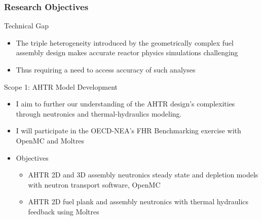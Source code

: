 \begin{frame}
  \frametitle{Research Objectives}
  \begin{block}{Technical Gap}
    \begin{itemize}
      \item The triple heterogeneity introduced by the geometrically complex 
      fuel assembly design makes accurate reactor physics simulations challenging
      \item Thus requiring a need to access accuracy of such analyses 
    \end{itemize}
  \end{block}
  \begin{block}{Scope 1: AHTR Model Development}
    \begin{itemize}
      \item I aim to further our understanding of the AHTR design's complexities 
      through neutronics and thermal-hydraulics modeling.
      \item I will participate in the OECD-NEA's FHR Benchmarking exercise with 
      OpenMC and Moltres
      \item Objectives 
      \begin{itemize}
        \item AHTR 2D and 3D assembly neutronics steady state and depletion models 
        with neutron transport software, OpenMC
        \item AHTR 2D fuel plank and assembly neutronics with thermal hydraulics 
        feedback using Moltres
      \end{itemize}
    \end{itemize}
  \end{block}
\end{frame}